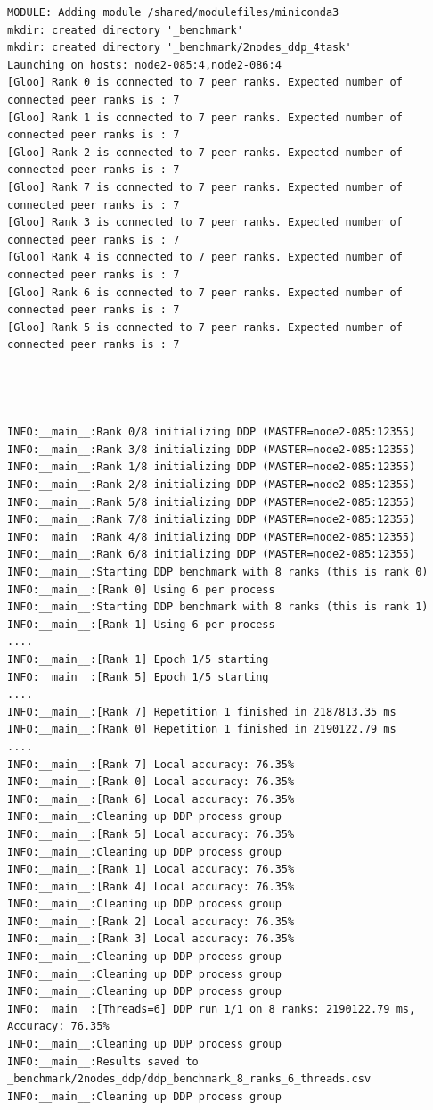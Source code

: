 \documentclass{article}
\begin{document}
\newpage
\begin{lstlisting}[basicstyle=\ttfamily\small, caption={Beispielausgabe des DDP-Slurm-Jobs mit 4 Tasks pro Knoten}, label={lst:slurm_output_2tasks}]
MODULE: Adding module /shared/modulefiles/miniconda3
mkdir: created directory '_benchmark'
mkdir: created directory '_benchmark/2nodes_ddp_4task'
Launching on hosts: node2-085:4,node2-086:4
[Gloo] Rank 0 is connected to 7 peer ranks. Expected number of connected peer ranks is : 7
[Gloo] Rank 1 is connected to 7 peer ranks. Expected number of connected peer ranks is : 7
[Gloo] Rank 2 is connected to 7 peer ranks. Expected number of connected peer ranks is : 7
[Gloo] Rank 7 is connected to 7 peer ranks. Expected number of connected peer ranks is : 7
[Gloo] Rank 3 is connected to 7 peer ranks. Expected number of connected peer ranks is : 7
[Gloo] Rank 4 is connected to 7 peer ranks. Expected number of connected peer ranks is : 7
[Gloo] Rank 6 is connected to 7 peer ranks. Expected number of connected peer ranks is : 7
[Gloo] Rank 5 is connected to 7 peer ranks. Expected number of connected peer ranks is : 7




INFO:__main__:Rank 0/8 initializing DDP (MASTER=node2-085:12355)
INFO:__main__:Rank 3/8 initializing DDP (MASTER=node2-085:12355)
INFO:__main__:Rank 1/8 initializing DDP (MASTER=node2-085:12355)
INFO:__main__:Rank 2/8 initializing DDP (MASTER=node2-085:12355)
INFO:__main__:Rank 5/8 initializing DDP (MASTER=node2-085:12355)
INFO:__main__:Rank 7/8 initializing DDP (MASTER=node2-085:12355)
INFO:__main__:Rank 4/8 initializing DDP (MASTER=node2-085:12355)
INFO:__main__:Rank 6/8 initializing DDP (MASTER=node2-085:12355)
INFO:__main__:Starting DDP benchmark with 8 ranks (this is rank 0)
INFO:__main__:[Rank 0] Using 6 per process
INFO:__main__:Starting DDP benchmark with 8 ranks (this is rank 1)
INFO:__main__:[Rank 1] Using 6 per process
....
INFO:__main__:[Rank 1] Epoch 1/5 starting
INFO:__main__:[Rank 5] Epoch 1/5 starting
....
INFO:__main__:[Rank 7] Repetition 1 finished in 2187813.35 ms
INFO:__main__:[Rank 0] Repetition 1 finished in 2190122.79 ms
....
INFO:__main__:[Rank 7] Local accuracy: 76.35%
INFO:__main__:[Rank 0] Local accuracy: 76.35%
INFO:__main__:[Rank 6] Local accuracy: 76.35%
INFO:__main__:Cleaning up DDP process group
INFO:__main__:[Rank 5] Local accuracy: 76.35%
INFO:__main__:Cleaning up DDP process group
INFO:__main__:[Rank 1] Local accuracy: 76.35%
INFO:__main__:[Rank 4] Local accuracy: 76.35%
INFO:__main__:Cleaning up DDP process group
INFO:__main__:[Rank 2] Local accuracy: 76.35%
INFO:__main__:[Rank 3] Local accuracy: 76.35%
INFO:__main__:Cleaning up DDP process group
INFO:__main__:Cleaning up DDP process group
INFO:__main__:Cleaning up DDP process group
INFO:__main__:[Threads=6] DDP run 1/1 on 8 ranks: 2190122.79 ms, Accuracy: 76.35%
INFO:__main__:Cleaning up DDP process group
INFO:__main__:Results saved to _benchmark/2nodes_ddp/ddp_benchmark_8_ranks_6_threads.csv
INFO:__main__:Cleaning up DDP process group
\end{lstlisting}
\end{document}
